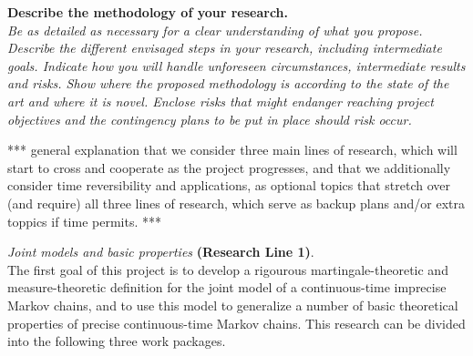 \documentclass[11pt,dvipsnames,usenames,a4paper]{article}
\begin{document}
\vspace{7pt}

\textbf{Describe the methodology of your research.}\\
\textit{Be as detailed as necessary for a clear understanding of what you propose.
Describe the different envisaged steps in your research, including intermediate goals. Indicate how you will handle unforeseen circumstances, intermediate results and risks.
Show where the proposed methodology is according to the state of the art and where it is novel.
Enclose risks that might endanger reaching project objectives and the contingency plans to be put in place should risk occur.}

*** general explanation that we consider three main lines of research, which will start to cross and cooperate as the project progresses, and that we additionally consider time reversibility and applications, as optional topics that stretch over (and require) all three lines of research, which serve as backup plans and/or extra toppics if time permits. ***

\vspace{5pt}
\emph{Joint models and basic properties} {\bf (Research Line 1)}.\\[5pt]

The first goal of this project is to develop a rigourous martingale-theoretic and measure-theoretic definition for the joint model of a continuous-time imprecise Markov chains, and to use this model to generalize a number of basic theoretical properties of precise continuous-time Markov chains. %
This research can be divided into the following three work packages.
\end{document}
